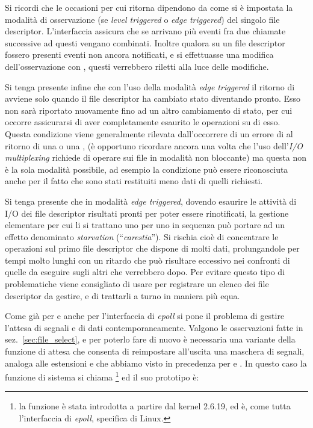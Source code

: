 Si ricordi che le occasioni per cui  ritorna dipendono da
come si è impostata la modalità di osservazione (se \textit{level triggered} o
\textit{edge triggered}) del singolo file descriptor. L'interfaccia assicura
che se arrivano più eventi fra due chiamate successive ad 
questi vengano combinati. Inoltre qualora su un file descriptor fossero
presenti eventi non ancora notificati, e si effettuasse una modifica
dell'osservazione con , questi verrebbero riletti alla
luce delle modifiche.

Si tenga presente infine che con l'uso della modalità \textit{edge triggered}
il ritorno di  avviene solo quando il file descriptor ha
cambiato stato diventando pronto. Esso non sarà riportato nuovamente fino ad
un altro cambiamento di stato, per cui occorre assicurarsi di aver
completamente esaurito le operazioni su di esso.  Questa condizione viene
generalmente rilevata dall'occorrere di un errore di  al
ritorno di una  o una , (è opportuno ricordare ancora
una volta che l'uso dell'\textit{I/O multiplexing} richiede di operare sui
file in modalità non bloccante) ma questa non è la sola modalità possibile, ad
esempio la condizione può essere riconosciuta anche per il fatto che sono
stati restituiti meno dati di quelli richiesti.

Si tenga presente che in modalità \textit{edge triggered}, dovendo esaurire le
attività di I/O dei file descriptor risultati pronti per poter essere
rinotificati, la gestione elementare per cui li si trattano uno per uno in
sequenza può portare ad un effetto denominato \textit{starvation}
(``\textsl{carestia}'').  Si rischia cioè di concentrare le operazioni sul
primo file descriptor che dispone di molti dati, prolungandole per tempi molto
lunghi con un ritardo che può risultare eccessivo nei confronti di quelle da
eseguire sugli altri che verrebbero dopo.  Per evitare questo tipo di
problematiche viene consigliato di usare  per registrare un
elenco dei file descriptor da gestire, e di trattarli a turno in maniera più
equa.

Come già per  e  anche per l'interfaccia di
\textit{epoll} si pone il problema di gestire l'attesa di segnali e di dati
contemporaneamente.  Valgono le osservazioni fatte in
sez.~\ref{sec:file_select}, e per poterlo fare di nuovo è necessaria una
variante della funzione di attesa che consenta di reimpostare all'uscita una
maschera di segnali, analoga alle estensioni  e  che
abbiamo visto in precedenza per  e . In questo caso la
funzione di sistema si chiama \footnote{la funzione è
  stata introdotta a partire dal kernel 2.6.19, ed è, come tutta l'interfaccia
  di \textit{epoll}, specifica di Linux.} ed il suo prototipo è:

